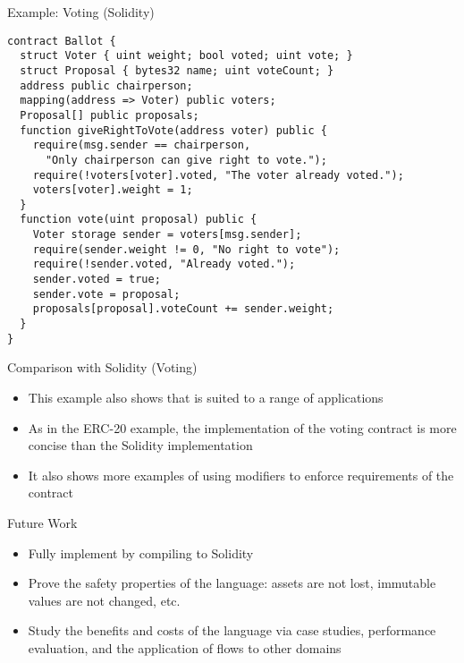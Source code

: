 \documentclass[leqno,presentation,usenames,dvipsnames]{beamer}
\begin{document}
\begin{frame}[fragile]{Example: Voting (Solidity)}
\begin{lstlisting}[language=Solidity, xleftmargin=-0.5em, basicstyle=\scriptsize\ttfamily]
contract Ballot {
  struct Voter { uint weight; bool voted; uint vote; }
  struct Proposal { bytes32 name; uint voteCount; }
  address public chairperson;
  mapping(address => Voter) public voters;
  Proposal[] public proposals;
  function giveRightToVote(address voter) public {
    require(msg.sender == chairperson,
      "Only chairperson can give right to vote.");
    require(!voters[voter].voted, "The voter already voted.");
    voters[voter].weight = 1;
  }
  function vote(uint proposal) public {
    Voter storage sender = voters[msg.sender];
    require(sender.weight != 0, "No right to vote");
    require(!sender.voted, "Already voted.");
    sender.voted = true;
    sender.vote = proposal;
    proposals[proposal].voteCount += sender.weight;
  }
}
\end{lstlisting}
\end{frame}

\begin{frame}[fragile]{Comparison with Solidity (Voting)}
    \begin{itemize}
        \item This example also shows that \langName is suited to a range of applications
        \item As in the ERC-20 example, the \langName implementation of the voting contract is more concise than the Solidity implementation
        \item It also shows more examples of using modifiers to enforce requirements of the contract
    \end{itemize}
\end{frame}

\begin{frame}{Future Work}
    \begin{itemize}
        \item Fully implement \langName by compiling to Solidity
        \item Prove the safety properties of the language: assets are not lost, immutable values are not changed, etc.
        \item Study the benefits and costs of the language via case studies, performance evaluation, and the application of flows to other domains
    \end{itemize}
\end{frame}
\end{document}

